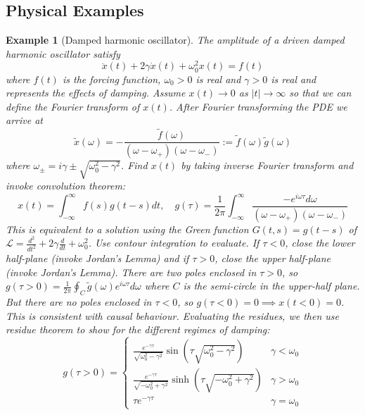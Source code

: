 \documentclass[a4paper]{article}
\newtheorem{eg}{Example}[section]
\theoremstyle{new}
\begin{document}
\subsection{Physical Examples}
\begin{eg}[Damped harmonic oscillator]
The amplitude of a driven damped harmonic oscillator satisfy
$$\ddot{x}(t)+2\gamma\dot{x}(t)+\omega_0^2x(t)=f(t)$$
where $f(t)$ is the forcing function, $\omega_0>0$ is real and $\gamma>0$ is real and represents the effects of damping. Assume $x(t)\rightarrow0$ as $|t|\rightarrow\infty$ so that we can define the Fourier transform of $x(t)$. After Fourier transforming the PDE we arrive at
$$\tilde{x}(\omega)=-\frac{\tilde{f}(\omega)}{(\omega-\omega_+)(\omega-\omega_-)}:=\tilde{f}(\omega)\tilde{g}(\omega)$$
where $\omega_\pm=i\gamma\pm\sqrt{\omega_0^2-\gamma^2}$. Find $x(t)$ by taking inverse Fourier transform and invoke convolution theorem:
$$x(t)=\int_{-\infty}^\infty f(s)g(t-s)dt,\quad g(\tau)=\frac{1}{2\pi}\int_{-\infty}^\infty\frac{-e^{i\omega\tau}d\omega}{(\omega-\omega_+)(\omega-\omega_-)}$$
This is equivalent to a solution using the Green function $G(t,s)=g(t-s)$ of $\mathcal{L}=\frac{d^2}{dt^2}+2\gamma\frac{d}{dt}+\omega_0^2$. Use contour integration to evaluate. If $\tau<0$, close the lower half-plane (invoke Jordan's Lemma) and if $\tau>0$, close the upper half-plane (invoke Jordan's Lemma). There are two poles enclosed in $\tau>0$, so $g(\tau>0)=\frac{1}{2\pi}\oint_C\tilde{g}(\omega)e^{i\omega\tau}d\omega$ where $C$ is the semi-circle in the upper-half plane. But there are no poles enclosed in $\tau<0$, so $g(\tau<0)=0\implies x(t<0)=0$. This is consistent with causal behaviour. Evaluating the residues, we then use residue theorem to show for the different regimes of damping:
$$g(\tau>0)=
\left\{
        \begin{array}{ll}
      \frac{e^{-\gamma\tau}}{\sqrt{\omega_0^2-\gamma^2}}\sin(\tau\sqrt{\omega_0^2-\gamma^2}) & \gamma<\omega_0\\
      \frac{e^{-\gamma\tau}}{\sqrt{-\omega_0^2+\gamma^2}}\sinh(\tau\sqrt{-\omega_0^2+\gamma^2}) & \gamma>\omega_0\\
      \tau e^{-\gamma\tau} & \gamma=\omega_0
        \end{array}
    \right.$$
\end{eg}
\end{document}
